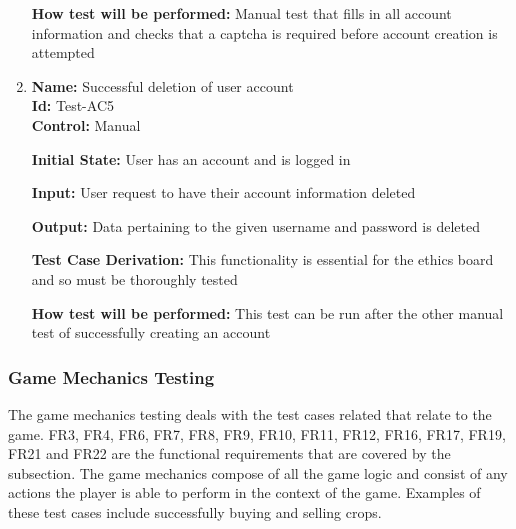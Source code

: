\documentclass[12pt, titlepage]{article}
\begin{document}
\begin{enumerate}
\textbf{How test will be performed:} Manual test that fills in all account information and checks that a captcha is required before account creation is attempted

\item{\textbf{Name:} Successful deletion of user account\\} %
\textbf{Id:} Test-AC5    \label{Test-AC5}\\
\textbf{Control:} Manual
					
\textbf{Initial State:} User has an account and is logged in
					
\textbf{Input:} User request to have their account information deleted
					
\textbf{Output:} Data pertaining to the given username and password is deleted

\textbf{Test Case Derivation:} This functionality is essential for the ethics board and so must be thoroughly tested

\textbf{How test will be performed:} This test can be run after the other manual test of successfully creating an account

\end{enumerate}

\subsubsection{Game Mechanics Testing}
The game mechanics testing deals with the test cases related that relate to the game. FR3, FR4, FR6, FR7, FR8, FR9, FR10, FR11, FR12, FR16, FR17, FR19, FR21 and FR22 are the functional requirements that are covered by the subsection. The game mechanics compose of all the game logic and consist of any actions the player is able to perform in the context of the game. Examples of these test cases include successfully buying and selling crops.
\end{document}
